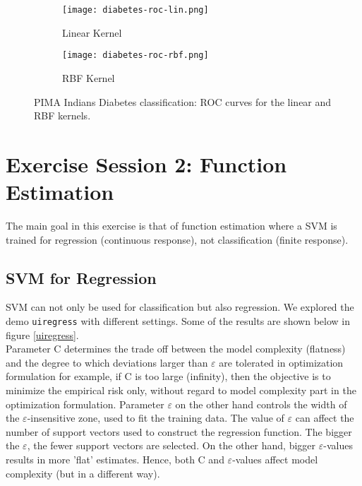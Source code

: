 \documentclass[paper=a4, fontsize=11pt]{scrartcl} %
\numberwithin{equation}{section} %
\begin{document}
\begin{figure}[ht]
\centering
	\begin{subfigure}[b]{0.5\textwidth}
		\centering
		\texttt{[image: diabetes-roc-lin.png]}
		\caption{Linear Kernel}
	\end{subfigure}%
	\begin{subfigure}[b]{0.5\textwidth}
		\centering
		\texttt{[image: diabetes-roc-rbf.png]}
		\caption{RBF Kernel}
	\end{subfigure}
\caption{PIMA Indians Diabetes classification: ROC curves for the linear and RBF kernels.}
\label{diabeetus-roc}
\end{figure}

\section{Exercise Session 2: Function Estimation}

The main goal in this exercise is that of function estimation where a SVM is trained for regression (continuous response), not classification (finite response).

\subsection{SVM for Regression}

SVM can not only be used for classification but also regression. We explored the demo \texttt{uiregress} with different settings. Some of the results are shown below in figure \ref{uiregress}.\\

Parameter C determines the trade off between the model complexity (flatness) and the degree to which deviations larger than $\varepsilon$ are tolerated in optimization formulation for example, if C is too large (infinity), then the objective is to minimize the empirical risk only, without regard to model complexity part in the optimization formulation. Parameter $\varepsilon$ on the other hand controls the width of the $\varepsilon$-insensitive zone, used to fit the training data. The value of $\varepsilon$ can affect the number of support vectors used to construct the regression function. The bigger the $\varepsilon$, the fewer support vectors are selected. On the other hand, bigger $\varepsilon$-values results in more 'flat' estimates. Hence, both C and $\varepsilon$-values affect model complexity (but in a different way).
 
\end{document}
